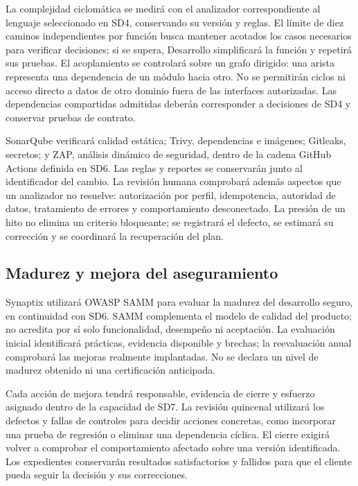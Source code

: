 La complejidad ciclomática se medirá con el analizador correspondiente al lenguaje seleccionado en SD4, conservando su versión y reglas. El límite de diez caminos independientes por función busca mantener acotados los casos necesarios para verificar decisiones; si se supera, Desarrollo simplificará la función y repetirá sus pruebas. El acoplamiento se controlará sobre un grafo dirigido: una arista representa una dependencia de un módulo hacia otro. No se permitirán ciclos ni acceso directo a datos de otro dominio fuera de las interfaces autorizadas. Las dependencias compartidas admitidas deberán corresponder a decisiones de SD4 y conservar pruebas de contrato.

SonarQube verificará calidad estática; Trivy, dependencias e imágenes; Gitleaks, secretos; y ZAP, análisis dinámico de seguridad, dentro de la cadena GitHub Actions definida en SD6. Las reglas y reportes se conservarán junto al identificador del cambio. La revisión humana comprobará además aspectos que un analizador no resuelve: autorización por perfil, idempotencia, autoridad de datos, tratamiento de errores y comportamiento desconectado. La presión de un hito no elimina un criterio bloqueante; se registrará el defecto, se estimará su corrección y se coordinará la recuperación del plan.

\subsection{Madurez y mejora del aseguramiento}
Synaptix utilizará OWASP SAMM para evaluar la madurez del desarrollo seguro, en continuidad con SD6. SAMM complementa el modelo de calidad del producto; no acredita por sí solo funcionalidad, desempeño ni aceptación. La evaluación inicial identificará prácticas, evidencia disponible y brechas; la reevaluación anual comprobará las mejoras realmente implantadas. No se declara un nivel de madurez obtenido ni una certificación anticipada. \parencite{sd9-samm}

Cada acción de mejora tendrá responsable, evidencia de cierre y esfuerzo asignado dentro de la capacidad de SD7. La revisión quincenal utilizará los defectos y fallas de controles para decidir acciones concretas, como incorporar una prueba de regresión o eliminar una dependencia cíclica. El cierre exigirá volver a comprobar el comportamiento afectado sobre una versión identificada. Los expedientes conservarán resultados satisfactorios y fallidos para que el cliente pueda seguir la decisión y sus correcciones.

